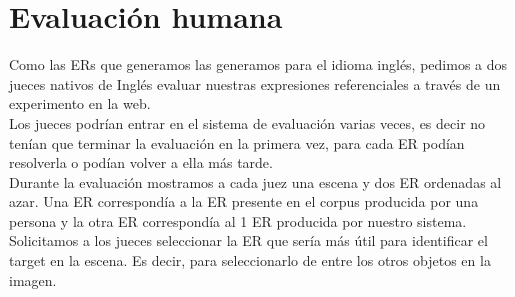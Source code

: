  

\section{Evaluaci\'on humana} \label{sec:humanevaluation}




Como las ERs que generamos las generamos para el idioma ingl\'es, pedimos a dos jueces nativos de Ingl\'es evaluar nuestras expresiones referenciales a trav\'es de un experimento en la web. \\

Los jueces podr\'{i}an entrar en el sistema de evaluaci\'on varias veces, es decir no ten\'ian que terminar la evaluaci\'on en la primera vez, para cada ER pod\'ian resolverla o pod\'ian volver a ella m\'as tarde. \\

Durante la evaluaci\'on mostramos a cada juez una escena y dos ER ordenadas al azar. Una ER correspond\'ia a la ER presente en el corpus producida por una persona y la otra ER correspond\'ia al 1 ER producida por nuestro sistema. Solicitamos a los jueces seleccionar la ER que ser\'{i}a m\'as \'util para identificar el target en la escena. Es decir, para seleccionarlo de entre los otros objetos en la imagen.\\

